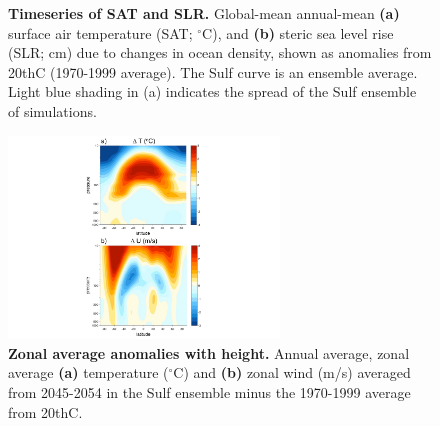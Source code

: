 \documentclass{nature}
\begin{document}
\begin{figure}
\caption{\textbf{Timeseries of SAT and SLR.} Global-mean annual-mean \textbf{(a)} surface air temperature (SAT; $^\circ$C), and \textbf{(b)} steric sea level rise (SLR; cm) due to changes in ocean density, shown as anomalies from 20thC (1970-1999 average). The Sulf curve is an ensemble average. Light blue shading in (a) indicates the spread of the Sulf ensemble of simulations.}
\label{fig:gmts} %
\end{figure}

\begin{figure}%
\noindent\includegraphics[width=17pc]{figures/verticalU_T_v20thC2.pdf}  %
\caption{\textbf{Zonal average anomalies with height.} Annual average, zonal average \textbf{(a)} temperature ($^\circ$C) and \textbf{(b)} zonal wind (m/s) averaged from 2045-2054 in the Sulf ensemble minus the 1970-1999 average from 20thC.}
\label{fig:vert}
\end{figure}
\end{document}
